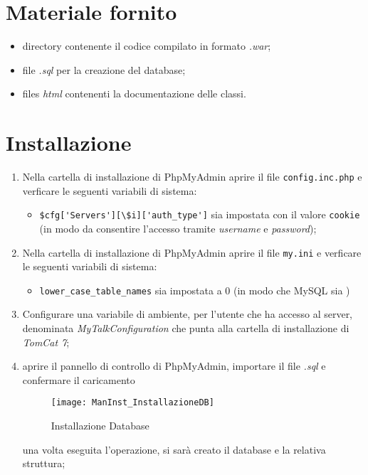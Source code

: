 \section{Materiale fornito}
\begin{itemize}
\item directory \caName{} contenente il codice compilato in formato \textit{.war};
\item file \textit{.sql} per la creazione del database;
\item files \textit{html} contenenti la documentazione delle classi.
\end{itemize} 

\section{Installazione}
\begin{enumerate}
\item Nella cartella di installazione di PhpMyAdmin aprire il file \texttt{config.inc.php} e verficare le seguenti variabili di sistema:
\begin{itemize}
\item \verb+$cfg['Servers'][\$i]['auth_type']+ sia impostata con il valore \texttt{cookie} (in modo da consentire l'accesso tramite \textit{username} e \textit{password});
\end{itemize}
\item Nella cartella di installazione di PhpMyAdmin aprire il file \texttt{my.ini} e verficare le seguenti variabili di sistema:
\begin{itemize}
\item \texttt{lower\_case\_table\_names} sia impostata a 0 (in modo che MySQL sia )
\end{itemize}
\item Configurare una variabile di ambiente, per l'utente che ha accesso al server, denominata \textit{MyTalkConfiguration} che punta alla cartella di installazione di \textit{TomCat 7};

\item aprire il pannello di controllo di PhpMyAdmin, importare il file \textit{.sql} e confermare il caricamento

\begin{figure}[H]
  \texttt{[image: ManInst\_InstallazioneDB]}
\caption{Installazione Database}\label{fig:InstallazioneDB}
\end{figure}
una volta eseguita l'operazione, si sarà creato il database e la relativa struttura;


\end{enumerate}
